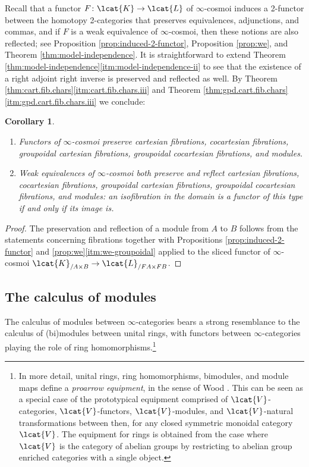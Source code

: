 \documentclass[12pt,reqno]{amsart}
\theoremstyle{plain}
\newtheorem{cor}[thm]{Corollary}
\theoremstyle{definition}
\theoremstyle{remark}
\numberwithin{equation}{subsection}
\begin{document}
Recall that a functor $F \colon \lcat{K} \to \lcat{L}$ of $\infty$-cosmoi induces a 2-functor between the homotopy 2-categories that preserves equivalences, adjunctions, and commas, and if $F$ is a weak equivalence of $\infty$-cosmoi, then these notions are also reflected; see Proposition \ref{prop:induced-2-functor}, Proposition \ref{prop:we}, and Theorem \ref{thm:model-independence}. It is straightforward to extend  Theorem \ref{thm:model-independence}\ref{itm:model-independence-ii} to see that the existence of a right adjoint right inverse is preserved and reflected as well. By Theorem \ref{thm:cart.fib.chars}\ref{itm:cart.fib.chars.iii} and Theorem \ref{thm:gpd.cart.fib.chars}\ref{itm:gpd.cart.fib.chars.iii} we conclude:

\begin{cor}\label{cor:model-indep-fib} $\quad$ 
\begin{enumerate}[label=(\roman*)]
\item Functors of $\infty$-cosmoi preserve cartesian fibrations, cocartesian fibrations, group\-oid\-al cartesian fibrations, groupoidal cocartesian fibrations, and modules.
\item Weak equivalences of $\infty$-cosmoi both preserve and reflect cartesian fibrations, cocartesian fibrations, groupoidal cartesian fibrations, groupoidal cocartesian fibrations, and modules: an isofibration in the domain is a functor of this type if and only if its image is.
\end{enumerate}
\end{cor}
\begin{proof}
The preservation and reflection of a module from $A$ to $B$ follows from the statements concerning fibrations together with Propositions \ref{prop:induced-2-functor} and \ref{prop:we}\ref{itm:we-groupoidal} applied to the sliced functor of $\infty$-cosmoi $\lcat{K}_{/A\times B} \to \lcat{L}_{/FA \times FB}$.
\end{proof}

\subsection{The calculus of modules}

The calculus of modules between $\infty$-categories bears a strong resemblance to the calculus of (bi)modules between unital rings, with functors between $\infty$-categories playing the role of ring homomorphisms.\footnote{In more detail, unital rings, ring homomorphisms, bimodules, and module maps define a \emph{proarrow equipment}, in the sense of Wood \cite{wood:proI}. This can be seen as a special case of the prototypical equipment comprised of $\lcat{V}$-categories, $\lcat{V}$-functors, $\lcat{V}$-modules, and $\lcat{V}$-natural transformations between then, for any closed symmetric monoidal category $\lcat{V}$. The equipment for rings is obtained from the case where $\lcat{V}$ is the category of abelian groups by restricting to abelian group enriched categories with a single object.}
\end{document}

